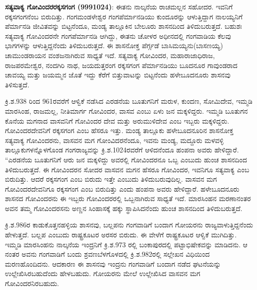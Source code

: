 \textbf{ ಸತ್ಯವಾಕ್ಯ ಗೋವಿಂದರರಕ್ಕಸಗಂಗ (9991024)}: ಈತನು ನಾಲ್ಕನೆಯ ರಾಚಮಲ್ಲನ ಸಹೋದರ. ಇವನಿಗೆ ರಕ್ಕಸಗಂಗನೆಂಬ ಬಿರುದಿತ್ತು. ಗಂಗಮಂಡಳೇಶ್ವರ ಗಂಗಪೆರ್ಮಾನಡಿಯು ಕುಂದೂರನ್ನು ಆಳುತ್ತಿದ್ದಾಗ ನಾಲಯ್ಯನಿಗೆ ಪೆರ್ಮಾನಡಿ ಜೀವಿತವನ್ನು ಬಿಟ್ಟನೆಂದೂ, ಮಂಡ್ಯ ತಾಲ್ಲೂಕಿನ ಬೇಲೂರು ಶಾಸನದಿಂದ ತಿಳಿದುಬರುತ್ತದೆ. ಬಹುಶಃ ಸತ್ಯವಾಕ್ಯ ಗೋವಿಂದರನೇ ಗಂಗಪೆರ್ಮಾನಡಿ ಆಗಿದ್ದು, ಈತನು ಚೋಳರ ಅಧೀನದಲ್ಲಿ ಗಂಗವಾಡಿಯ ಕೆಲವು ಭಾಗಗಳನ್ನು ಆಳುತ್ತಿದ್ದನೆಂದು ತಿಳಿದುಬರುತ್ತದೆ. ಈ ಶಾಸನೋಕ್ತ ಪೆರ್ಗ್ಗಡೆ ಬಾಸಿಮಯ್ಯನು(ಬಾಸಣಯ್ಯ) ಚಾಮುಂಡರಾಯನ ವಂಶಜನಾಗಿರುವ ಸಾಧ್ಯತೆ ಇದೆ. ಸತ್ಯವಾಕ್ಯ ಗೋವಿಂದರ, ಮಹಾರಾಜಾಧಿರಾಜ, ರಾಜಪರಮೇಶ್ವರ, ನಂದಗಿರಿ ನಾಥ, ಜಯದುತ್ತರಂಗ ರಕ್ಕಸಗಂಗ ಪೆರ್ಮಾನಡಿಯು ಬೂದನೂರ ಗಾವುಂಡರಾದ ಚಾವಯ್ಯ ಮತ್ತು ಜಯಮ್ಮನ ಜೊತೆ ಇದ್ದು ಕೆರೆಗೆ ಬಿತ್ತುವಾಟನ್ನು ಬಿಟ್ಟನೆಂದು ಹಳೇಬೂದನೂರು ಶಾಸನವು ತಿಳಿಸುತ್ತದೆ.

ಕ್ರಿ.ಶ.938 ರಿಂದ 961ರವರೆಗೆ ಆಳ್ವಿಕೆ ನಡೆಸಿದ ಎರಡನೆಯ ಬೂತುಗನಿಗೆ ಮರುಳ, ಕುಂದಣ, ಸೋಮಿದೇವ, ಇಮ್ಮಡಿ ಮಾರಸಿಂಹ, ರಾಜಮಲ್ಲ, ನೀತಿಮಾರ್ಗ ಗೋವಿಂದರ, ವಾಸವ ಎಂಬು ಏಳು ಜನ ಮಕ್ಕಳಿದ್ದರು. ಇಮ್ಮಡಿ ಬೂತುಗನ ಕೊನೆಯ ಮಗನಾದ ವಾಸವನಿಗೆ ಗೋವಿಂದರ ದೇವ ಮತ್ತು ಅರುಮುಳಿದೇವ ಎಂಬ ಇಬ್ಬರು ಮಕ್ಕಳಿದ್ದರು. ಗೋವಿಂದರದೇವನಿಗೆ ರಕ್ಕಸಗಂಗ ಎಂಬ ಹೆಸರೂ ಇತ್ತು. ಮಂಡ್ಯ ತಾಲ್ಲೂಕು ಹಳೇಬೂದನೂರಿನ ಶಾಸನೋಕ್ತ ಸತ್ಯವಾಕ್ಯ ಗೋವಿಂದರನು, ವಾಸವನ ಮಗ ಗೋಂವಿದರನೆಂದೂ, ಇವನು ಮಂಡ್ಯ, ಮದ್ದೂರು ಮಳವಳ್ಳಿ ತಾಲ್ಲೂಕುಗಳನ್ನೊಳಗೊಂಡ ಗಂಗರಾಜ್ಯವನ್ನು ಕ್ರಿ.ಶ.1024ರವರೆಗೆ ಆಳಿದನೆಂದೂ ಹಂಪನಾ ಅವರು ಹೇಳಿದ್ದಾರೆ. “ಎರಡನೆಯ ಬೂತುಗನಿಗೆ ಆರು ಜನ ಮಕ್ಕಳಿದ್ದು ಅವರಲ್ಲಿ ಗೋವಿಂದರನೂ ಒಬ್ಬ ಎಂಬುದು ಹುಂಚ ಶಾಸನದಿಂದ ತಿಳಿದುಬರುತ್ತದೆ. ಈ ಗೋವಿಂದರನ ಸೋದರ ವಾಸವನ ಮಗನ ಹೆಸರೂ ಗೋವಿಂದರ, ಇವನಿಗೂ ಸತ್ಯವಾಕ್ಯ ಎಂಬ ಬಿರುದಿತ್ತು. ಆದರೆ ರಕ್ಕಸಗಂಗ ಎಂಬ ಬಿರುದು ಇತ್ತೇ ಎಂಬುದು ತಿಳಿದುಬರುವುದಿಲ್ಲ. ವಾಸವನ ಮಗ ಗೋವಿಂದರದೇವನಿಗೂ ರಕ್ಕಸಗಂಗ ಎಂಬ ಬಿರುದಿತ್ತು ಎಂದು ಹಂಪನಾ ಅವರು ಹೇಳಿದ್ದಾರೆ. ಹಳೇಬೂದನೂರು ಶಾಸನದ ಗೋವಿಂದರನು ಈ ಇಬ್ಬರು ಗೋವಿಂದರರಲ್ಲಿ ಒಬ್ಬನಾಗಿರುವ ಸಾಧ್ಯತೆ ಇದೆ. ಮಾರಸಿಂಹನ ಮರಣಾನಂತರ ಅವನ ತಮ್ಮ ಗೋವಿಂದರಸನು ಅಣ್ಣನ ಸಿಂಹಾಸಕ್ಕೆ ಹಕ್ಕು ಸ್ಥಾಪಿಸಿದನೆಂದು ಹುಂಚ ಶಾಸನದಿಂದ ತಿಳಿದುಬರುತ್ತದೆ.

ಕ್ರಿ.ಶ.986ರ ಕಾಡುಕೊತ್ತನಹಳ್ಳಿಯ ಶಾಸನವು, ಬಲ್ಲಪನು ಗಂಗವಾಡಿಗೆ ಬಂದಾಗ ಗೋಯರನು ರಾಜ್ಯವಾಳುತ್ತಿದ್ದನೆಂದು ಹೇಳುತ್ತದೆ. ಬಲ್ಲಪ ಎಂಬುದು ರಾಷ್ಟ್ರಕೂಟರ ಅರಸರ ಬಿರುದು. ಈ ವೇಳೆಗೆ ರಾಷ್ಟ್ರಕೂಟರ ಆಳ್ವಿಕೆ ಮುಗಿದಿತ್ತು. ಇಮ್ಮಡಿ ಮಾರಸಿಂಹನು ನಾಲ್ಕನೆಯ ಇಂದ್ರನಿಗೆ ಕ್ರಿ.ಶ.973 ರಲ್ಲಿ ಬಂಕಾಪುರದಲ್ಲಿ ಪಟ್ಟಾಭಿಷೇಕವನ್ನು ಮಾಡಿದನು. ಆ ನಂತರ ಅವನು ಗಂಗವಾಡಿಗೆ ಬಂದು ಶ್ರವಣಬೆಳಗೊಳದಲ್ಲಿ ಕ್ರಿ.ಶ.982ರಲ್ಲಿ ಸಲ್ಲೇಖನ ವಿಧಿಯಿಂದ ಮರಣಹೊಂದಿದನು. ಆದಕಾರಣ ಈ ಶಾಸನವು ಇಂದ್ರನು ಗಂಗವಾಡಿಗೆ ಬಂದಾಗ ನಡೆದ ಘಟನೆಯನ್ನು ಉಲ್ಲೇಖಿಸಿರಬಹುದೆಂದು ಹೇಳಬಹುದು. ಗೋಯರನು ಮೇಲೆ ಉಲ್ಲೇಖಿಸಿದ ವಾಸವನ ಮಗ ಗೋವಿಂದರನಿರಬಹುದು. 

